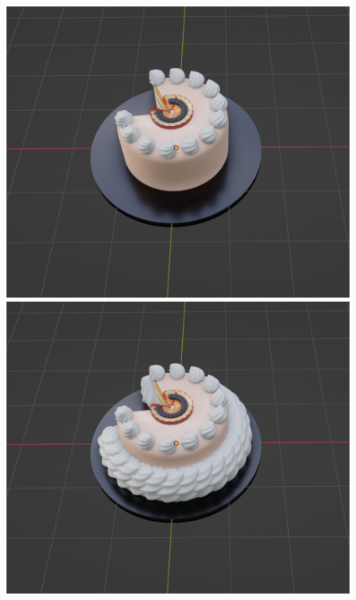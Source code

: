 \begin{figure}[h]
\begin{minipage}[b]{0.48\linewidth}
 \end{minipage}\\
  \begin{minipage}[b]{0.48\linewidth}
  \centering
  \includegraphics[scale=0.25]{./imgs/cakeParamMean/botSizeMin.png}
 \end{minipage}
 \begin{minipage}[b]{0.48\linewidth}
  \centering
  \includegraphics[scale=0.25]{./imgs/cakeParamMean/botSizeMax.png}

\end{minipage}
\end{figure}
